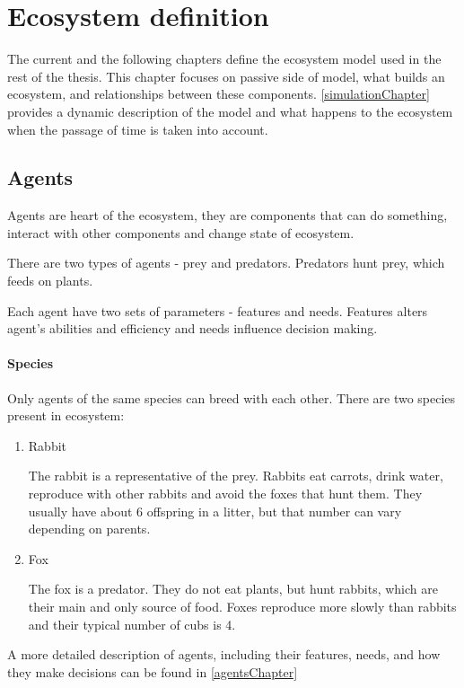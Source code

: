 \chapter{Ecosystem definition}
\label{ecosystemDefinitionChapter}

The current and the following chapters define the ecosystem model used in the rest of the thesis. This chapter focuses on passive side of model, what builds an ecosystem, and relationships between these components. \autoref{simulationChapter} provides a dynamic description of the model and what happens to the ecosystem when the passage of time is taken into account.

\section{Agents}
Agents are heart of the ecosystem, they are components that can do something, interact with other components and change state of ecosystem. 

There are two types of agents - prey and predators. Predators hunt prey, which feeds on plants.

Each agent have two sets of parameters - features and needs. Features alters agent's abilities and efficiency and needs influence decision making.

\subsubsection{Species}
Only agents of the same species can breed with each other. There are two species present in ecosystem:
\begin{enumerate}
    \item Rabbit
    
    The rabbit is a representative of the prey. Rabbits eat carrots, drink water, reproduce with other rabbits and avoid the foxes that hunt them. They usually have about 6 offspring in a litter, but that number can vary depending on parents.
    
    \item Fox
    
    The fox is a predator. They do not eat plants, but hunt rabbits, which are their main and only source of food. Foxes reproduce more slowly than rabbits and their typical number of cubs is 4.
\end{enumerate}

A more detailed description of agents, including their features, needs, and how they make decisions can be found in \autoref{agentsChapter}

